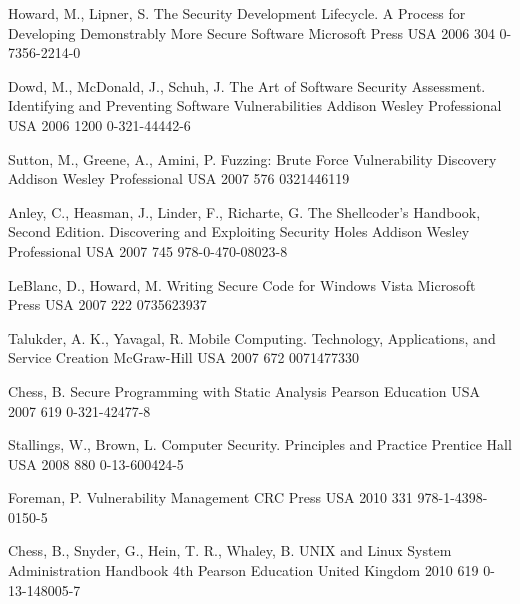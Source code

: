 \begin{thebibliography}{9}
		{Howard, M., Lipner, S.} %
		{The Security Development Lifecycle. A Process for Developing Demonstrably More Secure Software}
		{}
		{Microsoft Press}
		{USA}
		{2006}
		{304}
		{0-7356-2214-0}
	
		{Dowd, M., McDonald, J., Schuh, J.} %
		{The Art of Software Security Assessment. Identifying and Preventing Software Vulnerabilities}
		{}
		{Addison Wesley Professional}
		{USA}
		{2006}
		{1200}
		{0-321-44442-6}
	
		{Sutton, M., Greene, A., Amini, P.} %
		{Fuzzing: Brute Force Vulnerability Discovery}
		{}
		{Addison Wesley Professional}
		{USA}
		{2007}
		{576}
		{0321446119}
	
		{Anley, C., Heasman, J., Linder, F., Richarte, G.} %
		{The Shellcoder's Handbook, Second Edition. Discovering and Exploiting Security Holes}
		{}
		{Addison Wesley Professional}
		{USA}
		{2007}
		{745}
		{978-0-470-08023-8}
	
		{LeBlanc, D., Howard, M.} %
		{Writing Secure Code for {W}indows {V}ista}
		{}
		{Microsoft Press}
		{USA}
		{2007}
		{222}
		{0735623937}
	
		{Talukder, A. K., Yavagal, R.} %
		{Mobile Computing. Technology, Applications, and Service Creation}
		{}
		{McGraw-Hill}
		{USA}
		{2007}
		{672}
		{0071477330}
	
		{Chess, B.} %
		{Secure Programming with Static Analysis}
		{}
		{Pearson Education}
		{USA}
		{2007}
		{619}
		{0-321-42477-8}
	
		{Stallings, W., Brown, L.} %
		{Computer Security. Principles and Practice}
		{}
		{Prentice Hall}
		{USA}
		{2008}
		{880}
		{0-13-600424-5}
	
		{Foreman, P.} %
		{Vulnerability Management}
		{}
		{CRC Press}
		{USA}
		{2010}
		{331}
		{978-1-4398-0150-5}
	
		{Chess, B., Snyder, G., Hein, T. R., Whaley, B.} %
		{{UNIX} and {L}inux System Administration Handbook}
		{4th}
		{Pearson Education}
		{United Kingdom}
		{2010}
		{619}
		{0-13-148005-7}
		

\end{thebibliography}
